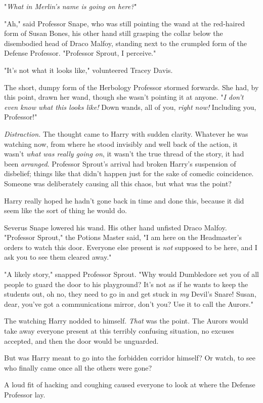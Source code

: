 "\emph{What in Merlin's name is going on here?}"

"Ah," said Professor Snape, who was still pointing the wand at the red-haired
form of Susan Bones, his other hand still grasping the collar below the
disembodied head of Draco Malfoy, standing next to the crumpled form of the
Defense Professor. "Professor Sprout, I perceive."

"It's not what it looks like," volunteered Tracey Davis.

The short, dumpy form of the Herbology Professor stormed forwards. She had, by
this point, drawn her wand, though she wasn't pointing it at anyone. "\emph{I
don't even know what this looks like!} Down wands, all of you, \emph{right
now!} Including you, Professor!"

\emph{Distraction.} The thought came to Harry with sudden clarity. Whatever he
was watching now, from where he stood invisibly and well back of the action, it
wasn't \emph{what was really going on}, it wasn't the true thread of the story,
it had been \emph{arranged}. Professor Sprout's arrival had broken Harry's
suspension of disbelief; things like that didn't happen just for the sake of
comedic coincidence. Someone was deliberately causing all this chaos, but what
was the point?

Harry really hoped he hadn't gone back in time and done this, because it did
seem like the sort of thing he would do.

Severus Snape lowered his wand. His other hand unfisted Draco Malfoy.
"Professor Sprout," the Potions Master said, "I am here on the Headmaster's
orders to watch this door. Everyone else present is \emph{not} supposed to be
here, and I ask you to see them cleared away."

"A likely story," snapped Professor Sprout. "Why would Dumbledore set you of
all people to guard the door to his playground? It's not as if he wants to keep
the students out, oh no, they need to go in and get stuck in \emph{my} Devil's
Snare! Susan, dear, you've got a communications mirror, don't you? Use it to
call the Aurors."

The watching Harry nodded to himself. \emph{That} was the point. The Aurors
would take away everyone present at this terribly confusing situation, no
excuses accepted, and then the door would be unguarded.

But was Harry meant to go into the forbidden corridor himself? Or watch, to see
who finally came once all the others were gone?

A loud fit of hacking and coughing caused everyone to look at where the Defense
Professor lay.

